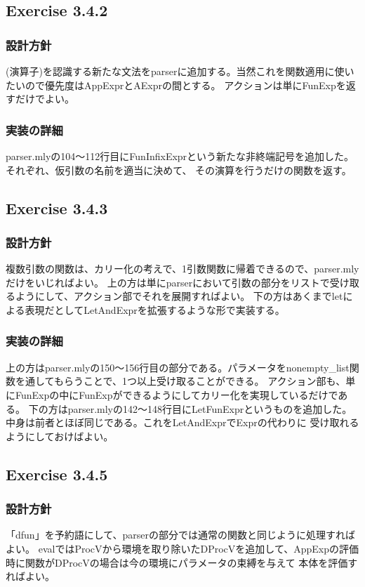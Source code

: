 \documentclass{jarticle}
\begin{document}
\subsection{Exercise 3.4.2}
\subsubsection{設計方針}
(演算子)を認識する新たな文法をparserに追加する。当然これを関数適用に使いたいので優先度はAppExprとAExprの間とする。
アクションは単にFunExpを返すだけでよい。
\subsubsection{実装の詳細}
parser.mlyの104〜112行目にFunInfixExprという新たな非終端記号を追加した。それぞれ、仮引数の名前を適当に決めて、
その演算を行うだけの関数を返す。

\subsection{Exercise 3.4.3}
\subsubsection{設計方針}
複数引数の関数は、カリー化の考えで、1引数関数に帰着できるので、parser.mlyだけをいじればよい。
上の方は単にparserにおいて引数の部分をリストで受け取るようにして、アクション部でそれを展開すればよい。
下の方はあくまでletによる表現だとしてLetAndExprを拡張するような形で実装する。
\subsubsection{実装の詳細}
上の方はparser.mlyの150〜156行目の部分である。パラメータをnonempty\_list関数を通してもらうことで、1つ以上受け取ることができる。
アクション部も、単にFunExpの中にFunExpができるようにしてカリー化を実現しているだけである。
下の方はparser.mlyの142〜148行目にLetFunExprというものを追加した。中身は前者とほぼ同じである。これをLetAndExprでExprの代わりに
受け取れるようにしておけばよい。

\subsection{Exercise 3.4.5}
\subsubsection{設計方針}
「dfun」を予約語にして、parserの部分では通常の関数と同じように処理すればよい。
evalではProcVから環境を取り除いたDProcVを追加して、AppExpの評価時に関数がDProcVの場合は今の環境にパラメータの束縛を与えて
本体を評価すればよい。
\end{document}
